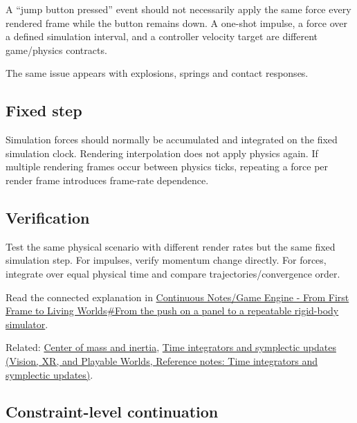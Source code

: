 \hypertarget{appendix-c39931e6e4c2-frame-event-versus-physical-force}{}

A ``jump button pressed'' event should not necessarily apply the same force every rendered frame while the button remains down. A one-shot impulse, a force over a defined simulation interval, and a controller velocity target are different game/physics contracts.

The same issue appears with explosions, springs and contact responses.

\subsection{Fixed step}\label{appendix-c39931e6e4c2-fixed-step}

\hypertarget{appendix-c39931e6e4c2-fixed-step}{}

Simulation forces should normally be accumulated and integrated on the fixed simulation clock. Rendering interpolation does not apply physics again. If multiple rendering frames occur between physics ticks, repeating a force per render frame introduces frame-rate dependence.

\subsection{Verification}\label{appendix-c39931e6e4c2-verification}

\hypertarget{appendix-c39931e6e4c2-verification}{}

Test the same physical scenario with different render rates but the same fixed simulation step. For impulses, verify momentum change directly. For forces, integrate over equal physical time and compare trajectories/convergence order.

Read the connected explanation in \hyperref[06-engine-ii-ch034-from-the-push-on-a-panel-to-a-repeatable-rigid-body-simulator]{Continuous Notes/Game Engine - From First Frame to Living Worlds\#From the push on a panel to a repeatable rigid-body simulator}.

Related: \hyperref[appendix-66742099f8a0]{Center of mass and inertia}, \href{../07-Vision-XR-and-Playable-Worlds/main.pdf\#nameddest=appendix-8f96f9c4d5bc}{Time integrators and symplectic updates (Vision, XR, and Playable Worlds, Reference notes: Time integrators and symplectic updates)}.

\subsection{Constraint-level continuation}\label{appendix-c39931e6e4c2-constraint-level-continuation}

